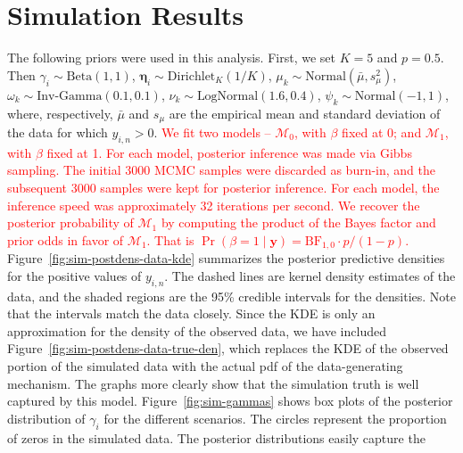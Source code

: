 \documentclass[12pt]{article} %
\newcommand{\Normal}{\text{Normal}}
\newcommand{\Beta}{\text{Beta}}
\newcommand{\InvGamma}{\text{Inv-Gamma}}
\newcommand{\Dirichlet}{\text{Dirichlet}}
\newcommand{\LogNormal}{\text{LogNormal}}
\newcommand{\true}{\text{TRUE}}
\newcommand{\alert}[1]{\textcolor{red}{#1}}
\begin{document}
\section{Simulation Results}\label{sec:sim-results}
The following priors were used in this analysis. First, we set $K=5$ and
$p=0.5$. Then $\gamma_i\sim\Beta(1, 1)$, $\bm\eta_i\sim\Dirichlet_K(1/K)$,
$\mu_k\sim\Normal(\bar{\mu}, s_\mu^2)$, $\omega_k\sim\InvGamma(0.1, 0.1)$,
$\nu_k\sim\LogNormal(1.6, 0.4)$, $\psi_k\sim\Normal(-1, 1)$, where,
respectively, $\bar{\mu}$ and $s_\mu$ are the empirical mean and standard
deviation of the data for which $y_{i,n} > 0$.
%
\alert{
We fit two models -- $\mathcal{M}_0$, with $\beta$ fixed at 0; and
$\mathcal{M}_1$, with $\beta$ fixed at 1. For each model, posterior inference
was made via Gibbs sampling. The initial 3000 MCMC samples were discarded as
burn-in, and the subsequent 3000 samples were kept for posterior inference.
For each model, the inference speed was approximately 32 iterations per
second. We recover the posterior probability of $\mathcal{M}_1$ by computing
the product of the Bayes factor and prior odds in favor of $\mathcal{M}_1$.
That is $\Pr(\beta=1 \mid \bm y) = \text{BF}_{1,0} \cdot p/(1-p)$.
}
%
%
Figure~\ref{fig:sim-postdens-data-kde} summarizes the posterior predictive
densities for the positive values of $y_{i,n}$. The dashed lines are kernel
density estimates of the data, and the shaded regions are the 95\% credible
intervals for the densities. Note that the intervals match the data closely.
%
Since the KDE is only an approximation for the density of the observed data,
we have included Figure~\ref{fig:sim-postdens-data-true-den}, which replaces
the KDE of the observed portion of the simulated data with the actual pdf of
the data-generating mechanism. The graphs more clearly show that the simulation
truth is well captured by this model. 
%
Figure~\ref{fig:sim-gammas} shows box plots of the posterior distribution of
$\gamma_i$ for the different scenarios. The circles represent the proportion
of zeros in the simulated data. The posterior distributions easily capture the
\end{document}

